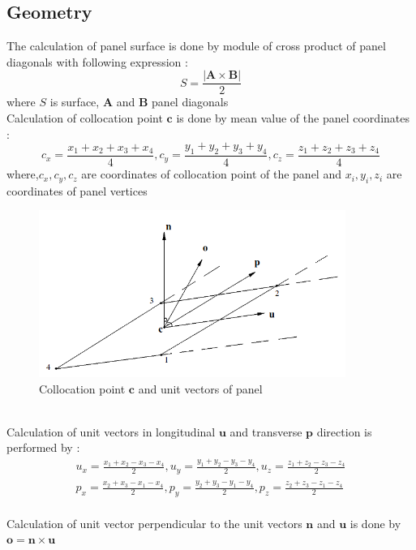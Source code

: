 \documentclass{article}
\begin{document}
\subsection{Geometry}
The calculation of panel surface is done by module of cross product of panel diagonals with following expression :
\begin{equation}
S = \frac{|\textbf{A}\times \textbf{B}|}{2}
\end{equation}
where $S$ is surface, $\textbf{A}$ and $\textbf{B}$ panel diagonals
\\ Calculation of collocation point $\textbf{c}$ is done by mean value of the panel coordinates :
\begin{equation}
c_x = \frac{x_1+x_2+x_3+x_4}{4} , c_y = \frac{y_1+y_2+y_3+y_4}{4} ,c_z = \frac{z_1+z_2+z_3+z_4}{4}
\end{equation}
where,$c_x,c_y,c_z$ are coordinates of collocation point of the panel and $x_i,y_i,z_i$ are coordinates of panel vertices 
\begin{figure}[ht]
	\centering
	\includegraphics[width=100mm,scale=0.5]{panelvectors.png}
	\caption{Collocation point $\textbf{c}$ and unit vectors of panel}
	\label{fig:panelvector}
\end{figure}
\\ Calculation of unit vectors in longitudinal $\textbf{u}$ and transverse $\textbf{p}$ direction is performed by :
\begin{align}
u_x = \frac{x_1+x_2-x_3-x_4}{2},u_y = \frac{y_1+y_2-y_3-y_4}{2},u_z = \frac{z_1+z_2-z_3-z_4}{2}
\\ p_x = \frac{x_2+x_3-x_1-x_4}{2},p_y = \frac{y_2+y_3-y_1-y_4}{2},p_z = \frac{z_2+z_3-z_1-z_4}{2}
\end{align} 
\\ Calculation of unit vector perpendicular to the unit vectors $\textbf{n}$ and $\textbf{u}$ is done by $\textbf{o}=\textbf{n}\times \textbf{u}$
\\ 
\end{document}
